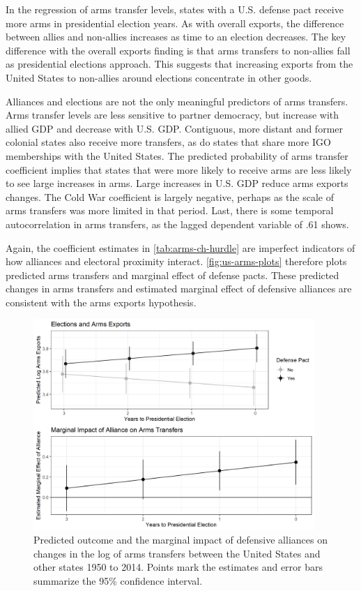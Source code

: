 \documentclass[12pt]{article}
\begin{document}
In the regression of arms transfer levels, states with a U.S. defense pact receive more arms in presidential election years. 
As with overall exports, the difference between allies and non-allies increases as time to an election decreases.
The key difference with the overall exports finding is that arms transfers to non-allies fall as presidential elections approach. 
This suggests that increasing exports from the United States to non-allies around elections concentrate in other goods. 


Alliances and elections are not the only meaningful predictors of arms transfers.
Arms transfer levels are less sensitive to partner democracy, but increase with allied GDP and decrease with U.S. GDP. 
Contiguous, more distant and former colonial states also receive more transfers, as do states that share more IGO memberships with the United States.
The predicted probability of arms transfer coefficient implies that states that were more likely to receive arms are less likely to see large increases in arms. 
Large increases in U.S. GDP reduce arms exports changes. 
The Cold War coefficient is largely negative, perhaps as the scale of arms transfers was more limited in that period. 
Last, there is some temporal autocorrelation in arms transfers, as the lagged dependent variable of .61 shows.


Again, the coefficient estimates in \autoref{tab:arms-ch-hurdle} are imperfect indicators of how alliances and electoral proximity interact.
\autoref{fig:us-arms-plots} therefore plots predicted arms transfers and marginal effect of defense pacts.
These predicted changes in arms transfers and estimated marginal effect of defensive alliances are consistent with the arms exports hypothesis.


\begin{figure}[htpb]
	\centering
		\includegraphics[width=0.95\textwidth]{../figures/us-arms-plots.png}
	\caption{Predicted outcome and the marginal impact of defensive alliances on changes in the log of arms transfers between the United States and other states 1950 to 2014. Points mark the estimates and error bars summarize the 95\% confidence interval.}
	\label{fig:us-arms-plots}
\end{figure}
\end{document}

